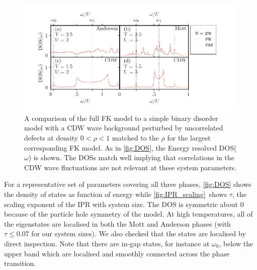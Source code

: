 \hypertarget{fig:DM_DOS}{%
\begin{figure}
\centering
\includegraphics[width=1\textwidth,height=\textheight]{figure_code/fk_chapter/disorder_model/DM_DOS}
\caption[{FK model compared to binary disorder model: DOS}]{A comparison of the full FK model to a simple binary disorder model with a CDW wave background perturbed by uncorrelated defects at density \(0 < \rho < 1\) matched to the \(\rho\) for the largest corresponding FK model. As in \cref{fig:DOS}, the Energy resolved DOS(\(\omega\)) is shown. The DOSs match well implying that correlations in the CDW wave fluctuations are not relevant at these system parameters.}
\label{fig:DM_DOS}
\end{figure}
}

For a representative set of parameters covering all three phases, \cref{fig:DOS} shows the density of states as function of energy while \cref{fig:IPR_scaling}~shows \(\tau\), the scaling exponent of the IPR with system size. The DOS is symmetric about \(0\) because of the particle hole symmetry of the model. At high temperatures, all of the eigenstates are localised in both the Mott and Anderson phases (with \(\tau \leq 0.07\) for our system sizes). We also checked that the states are localised by direct inspection. Note that there are in-gap states, for instance at \(\omega_0\), below the upper band which are localised and smoothly connected across the phase transition.

